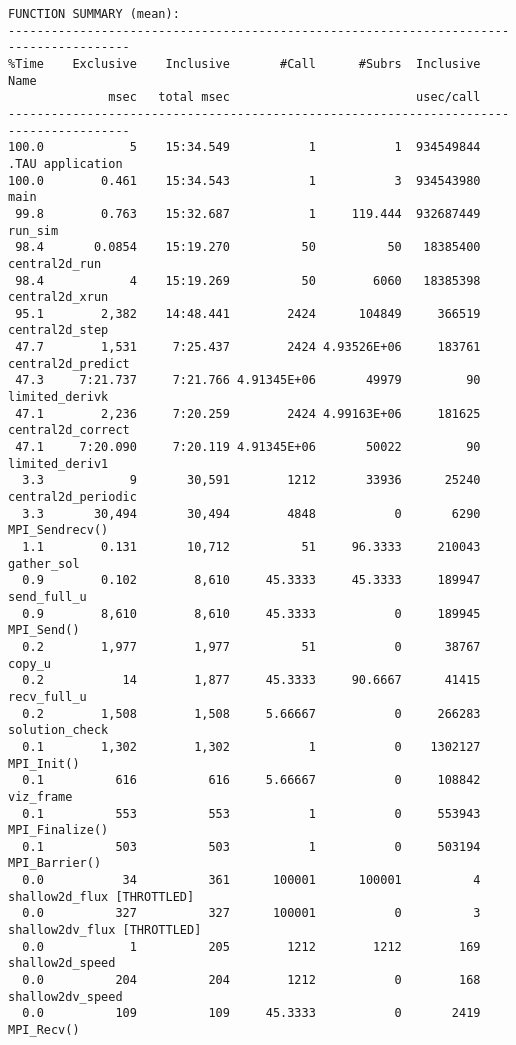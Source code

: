\documentclass{article}
\begin{document}
\noindent
{\footnotesize
\begin{verbatim}
FUNCTION SUMMARY (mean):
---------------------------------------------------------------------------------------
%Time    Exclusive    Inclusive       #Call      #Subrs  Inclusive Name
              msec   total msec                          usec/call 
---------------------------------------------------------------------------------------
100.0            5    15:34.549           1           1  934549844 .TAU application
100.0        0.461    15:34.543           1           3  934543980 main 
 99.8        0.763    15:32.687           1     119.444  932687449 run_sim 
 98.4       0.0854    15:19.270          50          50   18385400 central2d_run 
 98.4            4    15:19.269          50        6060   18385398 central2d_xrun 
 95.1        2,382    14:48.441        2424      104849     366519 central2d_step 
 47.7        1,531     7:25.437        2424 4.93526E+06     183761 central2d_predict 
 47.3     7:21.737     7:21.766 4.91345E+06       49979         90 limited_derivk 
 47.1        2,236     7:20.259        2424 4.99163E+06     181625 central2d_correct 
 47.1     7:20.090     7:20.119 4.91345E+06       50022         90 limited_deriv1 
  3.3            9       30,591        1212       33936      25240 central2d_periodic 
  3.3       30,494       30,494        4848           0       6290 MPI_Sendrecv() 
  1.1        0.131       10,712          51     96.3333     210043 gather_sol 
  0.9        0.102        8,610     45.3333     45.3333     189947 send_full_u 
  0.9        8,610        8,610     45.3333           0     189945 MPI_Send() 
  0.2        1,977        1,977          51           0      38767 copy_u 
  0.2           14        1,877     45.3333     90.6667      41415 recv_full_u 
  0.2        1,508        1,508     5.66667           0     266283 solution_check 
  0.1        1,302        1,302           1           0    1302127 MPI_Init() 
  0.1          616          616     5.66667           0     108842 viz_frame 
  0.1          553          553           1           0     553943 MPI_Finalize() 
  0.1          503          503           1           0     503194 MPI_Barrier() 
  0.0           34          361      100001      100001          4 shallow2d_flux [THROTTLED]
  0.0          327          327      100001           0          3 shallow2dv_flux [THROTTLED]
  0.0            1          205        1212        1212        169 shallow2d_speed 
  0.0          204          204        1212           0        168 shallow2dv_speed 
  0.0          109          109     45.3333           0       2419 MPI_Recv() 

\end{verbatim}}
\end{document}
